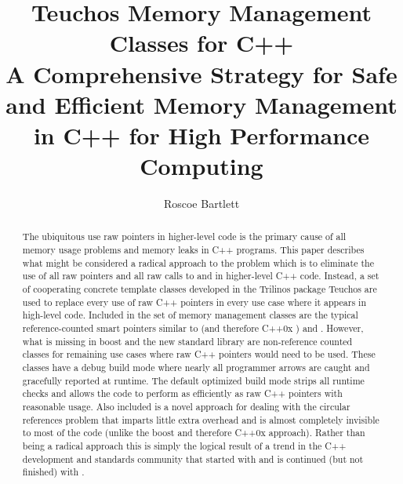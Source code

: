 \documentclass[pdf,ps2pdf,11pt]{SANDreport}
\title{\center
Teuchos Memory Management Classes for C++ \\[2ex] A Comprehensive
Strategy for Safe and Efficient Memory Management in C++ for High
Performance Computing }
\author{
Roscoe Bartlett
}
\date{}
\begin{document}
\maketitle


%


%
\begin{abstract}
%


The ubiquitous use raw pointers in higher-level code is the primary
cause of all memory usage problems and memory leaks in C++
programs. This paper describes what might be considered a radical
approach to the problem which is to eliminate the use of all raw
pointers and all raw calls to {} and {} in
higher-level C++ code.  Instead, a set of cooperating concrete
template classes developed in the Trilinos package Teuchos are used to
replace every use of raw C++ pointers in every use case where it
appears in high-level code.  Included in the set of memory management
classes are the typical reference-counted smart pointers similar to
{} (and therefore C++0x
{}) and {}.
However, what is missing in boost and the new standard library are
non-reference counted classes for remaining use cases where raw C++
pointers would need to be used.  These classes have a debug build mode
where nearly all programmer arrows are caught and gracefully reported
at runtime.  The default optimized build mode strips all runtime
checks and allows the code to perform as efficiently as raw C++
pointers with reasonable usage.  Also included is a novel approach for
dealing with the circular references problem that imparts little extra
overhead and is almost completely invisible to most of the code
(unlike the boost and therefore C++0x approach).  Rather than being a
radical approach this is simply the logical result of a trend in the
C++ development and standards community that started with
{} and is continued (but not finished) with
{}.

%
\end{abstract}
%

%
%
%
\end{document}
